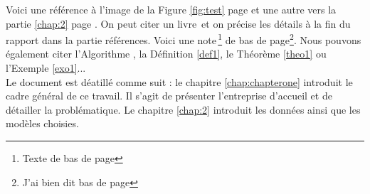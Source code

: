 


%
%


Voici une référence à l'image de la Figure \ref{fig:test} page \pageref{fig:test} et une autre vers la partie \ref{chap:2} page \pageref{chap:2}.
On peut citer un livre\, \cite{caillois1} et on précise les détails à la fin du rapport dans la partie références.
Voici une note\,\footnote{Texte de bas de page} de bas de page\footnote{J'ai bien dit bas de page}. Nous pouvons également citer l'Algorithme , la Définition \ref{def1}, le Théorème \ref{theo1} ou l'Exemple \ref{exo1}...\\

Le document est déatillé comme suit : le chapitre \ref{chap:chapterone} introduit le cadre général de ce travail. Il s'agit de présenter l'entreprise d'accueil et de détailler la problématique. Le chapitre \ref{chap:2} introduit les données ainsi que les modèles choisies. 


